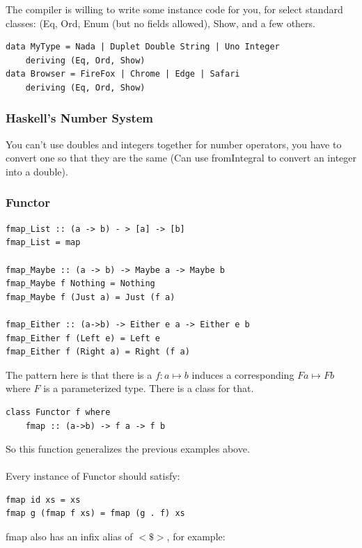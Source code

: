 \documentclass[12pt]{article}
\begin{document}
The compiler is willing to write some instance code for you, for select standard classes: (Eq, Ord, Enum (but no fields allowed), Show, and a few others.

\begin{lstlisting}
data MyType = Nada | Duplet Double String | Uno Integer
	deriving (Eq, Ord, Show)
data Browser = FireFox | Chrome | Edge | Safari
	deriving (Eq, Ord, Show)
\end{lstlisting}

\subsubsection{Haskell's Number System}

You can't use doubles and integers together for number operators, you have to convert one so that they are the same (Can use fromIntegral to convert an integer into a double).

\subsubsection{Functor}

\begin{lstlisting}
fmap_List :: (a -> b) - > [a] -> [b]
fmap_List = map

fmap_Maybe :: (a -> b) -> Maybe a -> Maybe b
fmap_Maybe f Nothing = Nothing
fmap_Maybe f (Just a) = Just (f a)

fmap_Either :: (a->b) -> Either e a -> Either e b
fmap_Either f (Left e) = Left e
fmap_Either f (Right a) = Right (f a)
\end{lstlisting}

The pattern here is that there is a $f:a \mapsto b$ induces a corresponding $F a \mapsto F b$ where $F$ is a parameterized type. There is a class for that.

\begin{lstlisting}
class Functor f where
	fmap :: (a->b) -> f a -> f b
\end{lstlisting}

So this function generalizes the previous examples above.\\
\\
Every instance of Functor should satisfy:

\begin{lstlisting}
fmap id xs = xs
fmap g (fmap f xs) = fmap (g . f) xs
\end{lstlisting}

fmap also has an infix alias of $<\$>$, for example:
\end{document}
